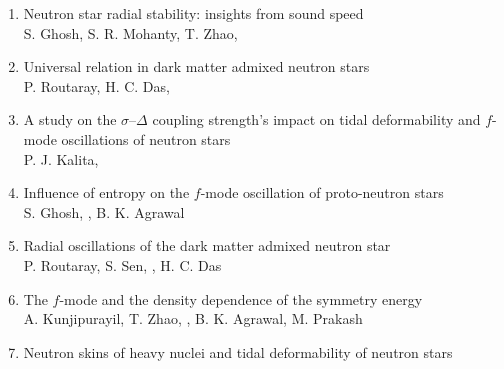
\begin{enumerate}

\item Neutron star radial stability: insights from sound speed\\
S. Ghosh, S. R. Mohanty, T. Zhao, \me\\
\quad
{}

\item Universal relation in dark matter admixed neutron stars\\
P. Routaray, H. C. Das, \me\\

\item A study on the $\sigma$--$\Delta$ coupling strength's impact on tidal
deformability and $f$-mode oscillations of neutron stars\\
P. J. Kalita, \me\\

\item Influence of entropy on the $f$-mode oscillation of proto-neutron stars\\
S. Ghosh, \me, B. K. Agrawal\\

\item Radial oscillations of the dark matter admixed neutron star\\
P. Routaray, S. Sen, \me, H. C. Das\\

\item The $f$-mode and the density dependence of the symmetry energy\\
A. Kunjipurayil, T. Zhao, \me, B. K. Agrawal, M. Prakash\\

\item \lead Neutron skins of heavy nuclei and tidal deformability of neutron
stars\\
\me\\
\quad
{}\pipe {}


\end{enumerate}
